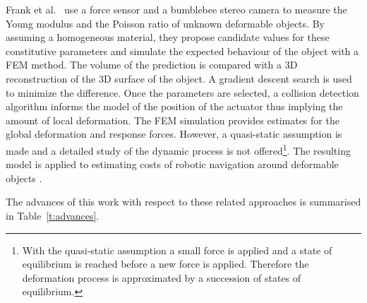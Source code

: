 \documentclass[journal]{IEEEtran}
\newcommand{\tref}[1]{Table~\ref{#1}}
\newcounter{algorithm}
\begin{document}
Frank et al.\ \cite{Frank2010} use a force sensor and a bumblebee stereo camera to measure the Young modulus and the Poisson ratio of unknown deformable objects.  By assuming a homogeneous material, they propose candidate values for these constitutive parameters and simulate the expected behaviour of the object with a FEM method.  The volume of the prediction is compared with a 3D reconstruction of the 3D surface of the object.  A gradient descent search is used to minimize the difference.  Once the parameters are selected, a collision detection algorithm informs the model of the position of the actuator thus implying the amount of local deformation.  The FEM simulation provides estimates for the global deformation and response forces.  However, a quasi-static assumption is made and a detailed study of the dynamic process is not offered\footnote{With the quasi-static assumption a small force is applied and a state of equilibrium is reached before a new force is applied.  Therefore the deformation process is approximated 
by a succession of states of equilibrium.}.  The resulting model is applied to estimating costs of robotic navigation around deformable objects \cite{Frank2011}.

The advances of this work with respect to these related approaches is summarised in \tref{t:advances}.
\end{document}
